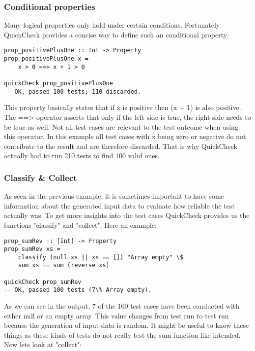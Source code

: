 \documentclass[a4paper, 12pt]{article} %
\begin{document}
\subsubsection{Conditional properties}

Many logical properties only hold under certain conditions. Fortunately QuickCheck provides a concise way to define such an conditional property:

\begin{verbatim}
prop_positivePlusOne :: Int -> Property
prop_positivePlusOne x = 
    x > 0 ==> x + 1 > 0

quickCheck prop_positivePlusOne  
-- OK, passed 100 tests; 110 discarded.
\end{verbatim}

This property basically states that if x is positive then (x + 1) is also positive. The ==> operator asserts that only if the left side is true, the right side needs to be true as well. \cite{Claessen2000} Not all test cases are relevant to the test outcome when using this operator. In this example all test cases with x being zero or negative do not contribute to the result and are therefore discarded. That is why QuickCheck actually had to run 210 tests to find 100 valid ones.  

\subsubsection{Classify \& Collect}

As seen in the previous example, it is sometimes important to have some information about the generated input data to evaluate how reliable the test actually was. To get more insights into the test cases QuickCheck provides us the functions "classify" and "collect". \cite{Claessen2000} Here an example:

\begin{verbatim}
prop_sumRev :: [Int] -> Property
prop_sumRev xs = 
    classify (null xs || xs == []) "Array empty" \$
    sum xs == sum (reverse xs)

quickCheck prop_sumRev
-- OK, passed 100 tests (7\% Array empty).
\end{verbatim}

As we can see in the output, 7 of the 100 test cases have been conducted with either null or an empty array. This value changes from test run to test run because the generation of input data is random. It might be useful to know these things as these kinds of tests do not really test the sum function like intended. Now lets look at "collect":
\end{document}
